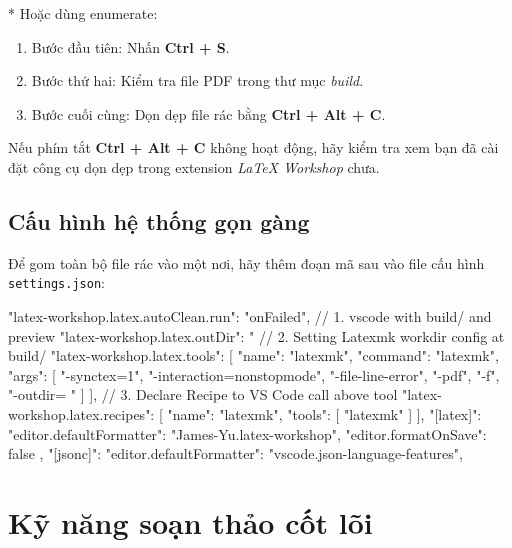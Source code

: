 \documentclass{article}
\begin{document}
* Hoặc dùng enumerate:

\begin{enumerate}
    \item Bước đầu tiên: Nhấn \textbf{Ctrl + S}.
    \item Bước thứ hai: Kiểm tra file PDF trong thư mục \textit{build}.
    \item Bước cuối cùng: Dọn dẹp file rác bằng \textbf{Ctrl + Alt + C}.
\end{enumerate}

\begin{ghichu}
    Nếu phím tắt \textbf{Ctrl + Alt + C} không hoạt động, hãy kiểm tra xem bạn đã cài đặt công cụ dọn dẹp trong extension \textit{LaTeX Workshop} chưa.
\end{ghichu}

\subsection{Cấu hình hệ thống gọn gàng}
Để gom toàn bộ file rác vào một nơi, hãy thêm đoạn mã sau vào file cấu hình \texttt{settings.json}:

\begin{customjson}
"latex-workshop.latex.autoClean.run": "onFailed",
    // 1. vscode with build/ and preview
    "latex-workshop.latex.outDir": "%
    // 2. Setting Latexmk workdir config at build/
    "latex-workshop.latex.tools": [
        {
            "name": "latexmk",
            "command": "latexmk",
            "args": [
                "-synctex=1",
                "-interaction=nonstopmode",
                "-file-line-error",
                "-pdf",
                "-f",
                "-outdir=%
                "%
            ]
        }
    ],
    // 3. Declare Recipe to VS Code call above tool
    "latex-workshop.latex.recipes": [
        {
            "name": "latexmk",
            "tools": [
                "latexmk"
            ]
        }
    ],
    "[latex]": {
        "editor.defaultFormatter": "James-Yu.latex-workshop",
        "editor.formatOnSave": false
    },
    "[jsonc]": {
        "editor.defaultFormatter": "vscode.json-language-features",
    }
\end{customjson}

\section{Kỹ năng soạn thảo cốt lõi}
\end{document}

